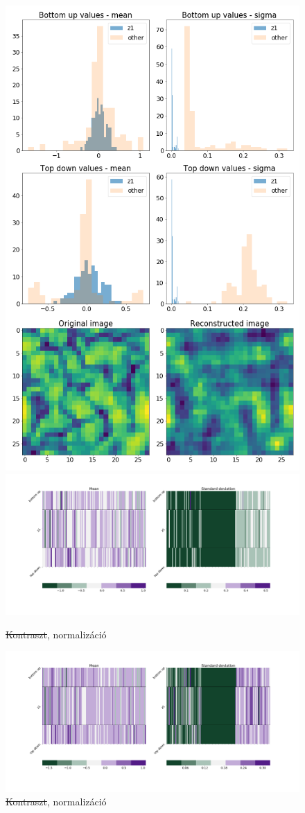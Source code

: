 \documentclass[12pt, english]{article}
\begin{document}
\begin{figure}[H]
\begin{minipage}{0.5\linewidth}
    \includegraphics[width=.6\linewidth]{z1_vis/z1_vis_no_contrast_norm/17_DenseLinLinLadderVAE_contrastNorm-stats-2_TD_BU_COMPS_1.png} 
  \end{minipage}

  \begin{minipage}{0.5\linewidth}
    \centering
    \includegraphics[width=.75\linewidth]{z1_vis/z1_vis_no_contrast_norm/17_DenseLinLinLadderVAE_contrastNorm-stats-1_vector_comparisons_1.png} 
    \caption{\st{Kontraszt}, normalizáció}
    \label{fig:sample-norm-no-contrast-1}
  \end{minipage}
  \begin{minipage}{0.5\linewidth}
    \centering
    \includegraphics[width=.75\linewidth]{z1_vis/z1_vis_no_contrast_norm/17_DenseLinLinLadderVAE_contrastNorm-stats-2_vector_comparisons_1.png}
    \caption{\st{Kontraszt}, normalizáció}
    \label{fig:sample-norm-no-contrast-2}
  \end{minipage}
\end{figure}
\end{document}
